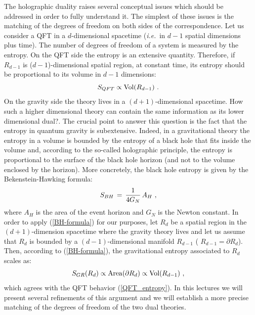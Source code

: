 \documentclass[12pt,notitlepage]{article}
\newcommand{\beq}{\begin{equation}}
\newcommand{\eeq}{\end{equation}}
\def\ie{{\emph{i.e.}}}
\begin{document}
The holographic duality raises several conceptual issues which should be addressed in order to fully understand it. The simplest of these issues is the 
matching of the degrees of freedom on both sides of the correspondence.  Let us consider a QFT in a $d$-dimensional spacetime (\ie\ in $d-1$ spatial dimensions plus time). The number of degrees of freedom of a system is measured by the entropy. On the QFT side the entropy is an extensive quantity. Therefore, if  $R_{d-1}$ is  ($d-1$)-dimensional spatial region, at constant time,  its entropy should be proportional to its volume in $d-1$ dimensions:
\beq
S_{QFT}\propto {\rm Vol}(R_{d-1})\,\,.
\label{QFT_entropy}
\eeq
On the gravity side the theory lives in a $(d+1)$-dimensional spacetime. How such a higher dimensional theory can contain the same information as its lower dimensional dual?. The crucial point to answer this question is the fact  that the entropy in quantum gravity is subextensive. Indeed, in a gravitational theory the entropy in a volume is bounded by the entropy of a black hole that fits inside the volume and, according to the so-called holographic principle, the entropy is proportional to the surface of the black hole horizon (and not to  the volume enclosed by the horizon). More concretely, the black hole entropy is given by the 
Bekenstein-Hawking formula:
\beq
S_{BH}\,=\,{1\over 4 G_N}\,A_{H}\,\,,
\label{BH-formula}
\eeq
where $A_H$ is the area of the event horizon and $G_N$ is the Newton constant. In order to apply (\ref{BH-formula}) for our purposes, let $R_{d}$ be a spatial region in  the $(d+1)$-dimension spacetime where the gravity theory lives and let us assume that  $R_{d}$ is bounded by a $(d-1)$-dimensional manifold $R_{d-1}$ ( $R_{d-1}=\partial R_{d}$). Then, according to (\ref{BH-formula}), the gravitational entropy associated to $R_{d}$ scales as:
\beq
S_{GR} (R_{d})\propto {\rm Area}(\partial R_{d})\propto {\rm Vol} (R_{d-1})\,\,,
\label{GR_entropy}
\eeq
which agrees with the QFT behavior (\ref{QFT_entropy}). In this lectures we will present several refinements of this argument and we will establish a more precise matching of the degrees of freedom of the two dual theories.
\end{document}
